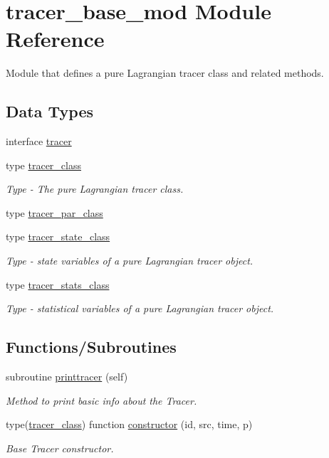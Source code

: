 \hypertarget{namespacetracer__base__mod}{}\section{tracer\+\_\+base\+\_\+mod Module Reference}
\label{namespacetracer__base__mod}


Module that defines a pure Lagrangian tracer class and related methods.  


\subsection*{Data Types}
\begin{DoxyCompactItemize}
\item 
interface \mbox{\hyperlink{interfacetracer__base__mod_1_1tracer}{tracer}}
\item 
type \mbox{\hyperlink{structtracer__base__mod_1_1tracer__class}{tracer\+\_\+class}}
\begin{DoxyCompactList}\small\item\em Type -\/ The pure Lagrangian tracer class. \end{DoxyCompactList}\item 
type \mbox{\hyperlink{structtracer__base__mod_1_1tracer__par__class}{tracer\+\_\+par\+\_\+class}}
\item 
type \mbox{\hyperlink{structtracer__base__mod_1_1tracer__state__class}{tracer\+\_\+state\+\_\+class}}
\begin{DoxyCompactList}\small\item\em Type -\/ state variables of a pure Lagrangian tracer object. \end{DoxyCompactList}\item 
type \mbox{\hyperlink{structtracer__base__mod_1_1tracer__stats__class}{tracer\+\_\+stats\+\_\+class}}
\begin{DoxyCompactList}\small\item\em Type -\/ statistical variables of a pure Lagrangian tracer object. \end{DoxyCompactList}\end{DoxyCompactItemize}
\subsection*{Functions/\+Subroutines}
\begin{DoxyCompactItemize}
\item 
subroutine \mbox{\hyperlink{namespacetracer__base__mod_a947559c248d9ddb1337721b71448167b}{printtracer}} (self)
\begin{DoxyCompactList}\small\item\em Method to print basic info about the Tracer. \end{DoxyCompactList}\item 
type(\mbox{\hyperlink{structtracer__base__mod_1_1tracer__class}{tracer\+\_\+class}}) function \mbox{\hyperlink{namespacetracer__base__mod_ab1e40296d34ae434e792768d1b77859f}{constructor}} (id, src, time, p)
\begin{DoxyCompactList}\small\item\em Base Tracer constructor. \end{DoxyCompactList}\end{DoxyCompactItemize}
